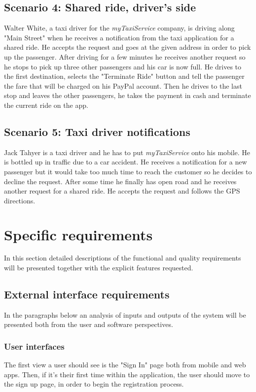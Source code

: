 \documentclass{article}
\begin{document}
\subsection{Scenario 4: Shared ride, driver's side}
Walter White, a taxi driver for the \textit{myTaxiService} company, is driving along "Main Street" when he receives a notification from the taxi application for a shared ride. He accepts the request and goes at the given address in order to pick up the passenger. After driving for a few minutes he receives another request so he stops to pick up three other passengers and his car is now full. He drives to the first destination, selects the "Terminate Ride" button and tell the passenger the fare that will be charged on his PayPal account. Then he drives to the last stop and leaves the other passengers, he takes the payment in cash and terminate the current ride on the app.

\subsection{Scenario 5: Taxi driver notifications}
Jack Tahyer is a taxi driver and he has to put \textit{myTaxiService} onto his mobile. He is bottled up in traffic due to a car accident. He receives a notification for a new passenger but it would take too much time to reach the customer so he decides to decline the request. After some time he finally has open road and he receives another request for a shared ride. He accepts the request and follows the GPS directions.

\section{Specific requirements}
In this section detailed descriptions of the functional and quality requirements will be presented together with the explicit features requested.
\subsection{External interface requirements}
In the paragraphs below an analysis of inputs and outputs of the system will be presented both from the user and software perspectives.
\subsubsection{User interfaces}
The first view a user should see is the "Sign In" page both from mobile and web apps.
Then, if it's their first time within the application, the user should move to the sign up page, in order to begin the registration process.
\newpage
\end{document}
